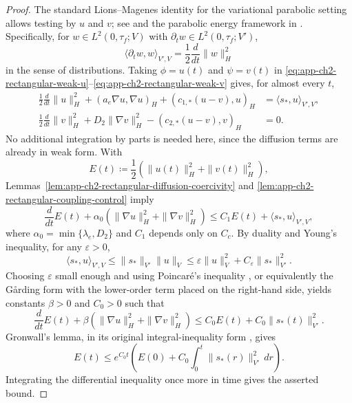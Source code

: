 \begin{proof}
    The standard Lions--Magenes identity for the variational parabolic setting allows testing by \(u\) and \(v\); see \cite[Lemma~1.2]{Temam_1984} and the parabolic energy framework in \cite[Chapter~III]{Ladyzhenskaya_1968}. Specifically, for \(w\in L^2(0,\tau_f;V)\) with \(\partial_tw\in L^2(0,\tau_f;V')\),
    \[
        \langle\partial_tw,w\rangle_{V',V}
        =
        \frac{1}{2}\frac{d}{dt}\|w\|_H^2
    \]
    in the sense of distributions. Taking \(\phi=u(t)\) and \(\psi=v(t)\) in \eqref{eq:app-ch2-rectangular-weak-u}--\eqref{eq:app-ch2-rectangular-weak-v} gives, for almost every \(t\),
    \begin{align*}
        \frac{1}{2}\frac{d}{dt}\|u\|_H^2
        +
        (a_e\nabla u,\nabla u)_H
        +
        (c_{1,*}(u-v),u)_H
         & =
        \langle s_*,u\rangle_{V',V},
        \\
        \frac{1}{2}\frac{d}{dt}\|v\|_H^2
        +
        D_2\|\nabla v\|_H^2
        -
        (c_{2,*}(u-v),v)_H
         & =
        0.
    \end{align*}
    No additional integration by parts is needed here, since the diffusion terms are already in weak form. With
    \[
        E(t)\coloneqq
        \frac{1}{2}
        \left(
        \|u(t)\|_H^2+\|v(t)\|_H^2
        \right),
    \]
    Lemmas~\ref{lem:app-ch2-rectangular-diffusion-coercivity} and \ref{lem:app-ch2-rectangular-coupling-control} imply
    \[
        \frac{d}{dt}E(t)
        +
        \alpha_0
        \left(
        \|\nabla u\|_H^2+\|\nabla v\|_H^2
        \right)
        \le
        C_1E(t)
        +
        \langle s_*,u\rangle_{V',V},
    \]
    where \(\alpha_0=\min\{\lambda_e,D_2\}\) and \(C_1\) depends only on \(C_c\). By duality and Young's inequality, for any \(\varepsilon>0\),
    \[
        \langle s_*,u\rangle_{V',V}
        \le
        \|s_*\|_{V'}\|u\|_V
        \le
        \varepsilon\|u\|_V^2
        +
        C_{\varepsilon}\|s_*\|_{V'}^2.
    \]
    Choosing \(\varepsilon\) small enough and using Poincar\'e's inequality \cite[Section~5.8.1, Theorem~1]{Evans_2010}, or equivalently the G{\aa}rding form with the lower-order term placed on the right-hand side, yields constants \(\beta>0\) and \(C_0>0\) such that
    \[
        \frac{d}{dt}E(t)
        +
        \beta
        \left(
        \|\nabla u\|_H^2+\|\nabla v\|_H^2
        \right)
        \le
        C_0E(t)
        +
        C_0\|s_*(t)\|_{V'}^2.
    \]
    Gronwall's lemma, in its original integral-inequality form \cite[pp.~292--296]{Gronwall_1919}, gives
    \[
        E(t)
        \le
        e^{C_0t}
        \left(
        E(0)
        +
        C_0\int_0^t\|s_*(r)\|_{V'}^2\,dr
        \right).
    \]
    Integrating the differential inequality once more in time gives the asserted bound.
\end{proof}

